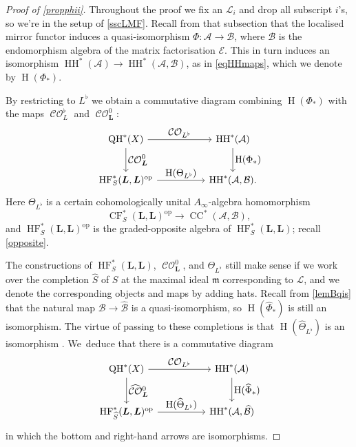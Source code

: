\documentclass[JEP,XML,SOM,Unicode,NoEqCountersInSection,NoFloatCountersInSection,published]{cedram}
\let\ts\textstyle
\theoremstyle{definition}
\newcommand{\LL}{L^\flat}
\newcommand{\hatS}{\widehat{S}}
\newcommand{\hatCO}{\widehat{\CO}{}^0_\bL}
\newcommand{\hatB}{\widehat{\calB}}
\newcommand{\hatPhi}{\widehat{\Phi}}
\newcommand{\hatTheta}{\widehat{\Theta}_{\LL}}
\newcommand{\calA}{\mathcal{A}}
\newcommand{\calB}{\mathcal{B}}
\newcommand{\calE}{\mathcal{E}}
\newcommand{\calL}{\mathcal{L}}
\newcommand{\bL}{{\boldsymbol{L}}}
\newcommand{\m}{\mathfrak{m}}
\newcommand{\op}{\mathrm{op}}
\newcommand{\rH}{\operatorname{H}}
\newcommand{\HH}{\operatorname{HH}}
\newcommand{\rCC}{\operatorname{CC}}
\newcommand{\HF}{\operatorname{HF}}
\newcommand{\CF}{\operatorname{CF}}
\newcommand{\CO}{\operatorname{\mathcal{CO}}}
\newcommand{\QH}{\operatorname{QH}}
\begin{document}
\begin{proof}[Proof of \cref{propphii}]
Throughout the proof we fix an $\calL_i$ and drop all subscript $i$'s, so we're in the setup of \cref{sscLMF}. Recall from that subsection that the localised mirror functor induces a quasi-isomorphism $\Phi : \calA \to \calB$, where $\calB$ is the endomorphism algebra of the matrix factorisation $\calE$. This in turn induces an isomorphism $\HH^*(\calA) \to \HH^*(\calA, \calB)$, as in \eqref{eqHHmaps}, which we denote by $\rH(\Phi_*)$.

By restricting \cite[Th.\,B]{SmithHHviaHF} to $\LL$ we obtain a commutative diagram combining $\rH(\Phi_*)$ with the maps $\CO_\LL$ and $\CO^0_\bL$:\vspace*{-3pt}
\begin{equation*}
\begin{tikzcd}[column sep=5em, row sep=2.5em]
\QH^*(X) \arrow{d}{\ts\CO^0_\bL} \arrow{r}{\ts\CO_{\LL}} & \HH^*(\calA) \arrow{d}{\ts\rH(\Phi_*)}
\\ \HF_S^*(\bL, \bL)^\op \arrow{r}{\ts\rH(\Theta_{\LL})} & \HH^*(\calA, \calB).
\end{tikzcd}
\end{equation*}
Here $\Theta_{\LL}$ is a certain cohomologically unital $A_\infty$-algebra homomorphism\vspace*{-3pt}
\[
\CF^*_S(\bL, \bL)^\op \to \rCC^*(\calA, \calB),
\]
and $\HF_S^*(\bL, \bL)^\op$ is the graded-opposite algebra of $\HF_S^*(\bL, \bL)$; recall \cref{opposite}.

The constructions of $\HF^*_S(\bL, \bL)$, $\CO^0_\bL$, and $\Theta_{\LL}$ still make sense if we work over the completion $\hatS$ of $S$ at the maximal ideal $\m$ corresponding to $\calL$, and we denote the corresponding objects and maps by adding hats. Recall from \cref{lemBqis} that the natural map $\calB \to \hatB$ is a quasi-isomorphism, so $\rH(\hatPhi_*)$ is still an isomorphism. The virtue of passing to these completions is that $\rH(\hatTheta)$ is an isomorphism \cite[Th.\,C]{SmithHHviaHF}. We~deduce that there is a commutative diagram\vspace*{-3pt}
\begin{equation*}
\label{eqCompletedDiagram}
\begin{tikzcd}[column sep=5em, row sep=2.5em]
\QH^*(X) \arrow{d}{\ts\hatCO} \arrow{r}{\ts\CO_{\LL}}& \HH^*(\calA) \arrow{d}{\ts\rH(\hatPhi_*)}
\\ \HF_{\hatS}^*(\bL, \bL)^\op \arrow{r}{\ts\rH(\hatTheta)} & \HH^*(\calA, \hatB)
\end{tikzcd}
\end{equation*}
in which the bottom and right-hand arrows are isomorphisms.


\end{proof}
\end{document}
